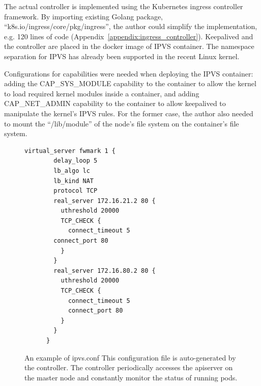 The actual controller \cite{ktaka_ccmp_2017_826894} is implemented using the Kubernetes ingress controller \cite{K8sIngress2017} framework. 
By importing existing Golang package, \enquote{k8s.io/ingress/core/pkg/ingress}, the author could simplify the implementation, e.g. 
120 lines of code (Appendix~\ref{appendix:ingress_controller}).
%
Keepalived and the controller are placed in the docker image of IPVS container.
The namespace separation for IPVS has already been supported in the recent Linux kernel. 

Configurations for capabilities were needed when deploying the IPVS container: adding the CAP\_SYS\_MODULE capability 
to the container to allow the kernel to load required kernel modules inside a container, 
and adding CAP\_NET\_ADMIN capability to the container to allow keepalived to manipulate the kernel's IPVS rules. 
For the former case, the author also needed to mount the \enquote{/lib/module} of the node's file system on the container's file system.

\begin{figure}[h]
  \centering
  \begin{minipage}{0.7\columnwidth}
    \begin{lstlisting}[frame=single]
      virtual_server fwmark 1 {
        delay_loop 5
        lb_algo lc
        lb_kind NAT
        protocol TCP
        real_server 172.16.21.2 80 {
          uthreshold 20000
          TCP_CHECK {
            connect_timeout 5
        connect_port 80
          }
        }
        real_server 172.16.80.2 80 {
          uthreshold 20000
          TCP_CHECK {
            connect_timeout 5
            connect_port 80
          }
        }
      }
    \end{lstlisting}
  \end{minipage}

  \par\bigskip
    \centering
    \begin{minipage}{0.9\columnwidth}
      \caption[An example of ipvs.conf]{
        An example of ipvs.conf
        This configuration file is auto-generated by the controller.
        The controller periodically accesses the apiserver on the master node and constantly monitor the status of running pods.
      }
      \label{fig:ipvs.conf}
    \end{minipage}
\end{figure}


